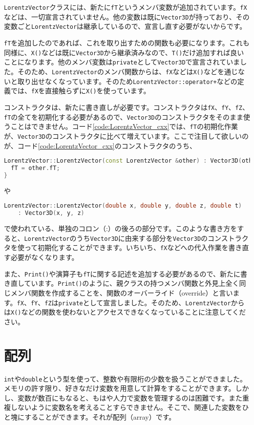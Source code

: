 \texttt{LorentzVector}クラスには、新たに\texttt{fT}というメンバ変数が追加されています。\texttt{fX}などは、一切宣言されていません。他の変数は既に\texttt{Vector3D}が持っており、その変数ごと\texttt{LorentzVector}は継承しているので、宣言し直す必要がないからです。

\texttt{fT}を追加したのであれば、これを取り出すための関数も必要になります。これも同様に、\texttt{X()}などは既に\texttt{Vector3D}から継承済みなので、\texttt{T()}だけ追加すれば良いことになります。他のメンバ変数は\texttt{private}として\texttt{Vector3D}で宣言されていました。そのため、\texttt{LorentzVector}のメンバ関数からは、\texttt{fX}などは\texttt{X()}などを通じないと取り出せなくなっています。そのため\texttt{LorentzVector::operator+}などの定義では、\texttt{fX}を直接触らずに\texttt{X()}を使っています。

コンストラクタは、新たに書き直しが必要です。コンストラクタは\texttt{fX}、\texttt{fY}、\texttt{fZ}、\texttt{fT}の全てを初期化する必要があるので、\texttt{Vector3D}のコンストラクタをそのまま使うことはできません。コード\ref{code:LorentzVector_cxx}では、\texttt{fT}の初期化作業が、\texttt{Vector3D}のコンストラクタに比べて増えています。ここで注目して欲しいのが、コード\ref{code:LorentzVector_cxx}のコンストラクタのうち、
\begin{lstlisting}[language=c++]
LorentzVector::LorentzVector(const LorentzVector &other) : Vector3D(other) {
  fT = other.fT;
}
\end{lstlisting}
や
\begin{lstlisting}[language=c++]
LorentzVector::LorentzVector(double x, double y, double z, double t)
    : Vector3D(x, y, z)
\end{lstlisting}
で使われている、単独のコロン（:）の後ろの部分です。このような書き方をすると、\texttt{LorentzVector}のうち\texttt{Vector3D}に由来する部分を\texttt{Vector3D}のコンストラクタを使って初期化することができます。いちいち、\texttt{fX}などへの代入作業を書き直す必要がなくなります。

また、\texttt{Print()}や演算子も\texttt{fT}に関する記述を追加する必要があるので、新たに書き直しています。\texttt{Print()}のように、親クラスの持つメンバ関数と外見上全く同じメンバ関数を作成することを、関数のオーバーライド（override）と言います。\texttt{fX}、\texttt{fY}、\texttt{fZ}は\texttt{private}として宣言しました。そのため、\texttt{LorentzVector}からは\texttt{X()}などの関数を使わないとアクセスできなくなっていることに注意してください。

\section{配列}
\label{sec:arrays}
\texttt{int}や\texttt{double}という型を使って、整数や有限桁の少数を扱うことができました。メモリの許す限り、好きなだけ変数を用意して計算をすることができます。しかし、変数が数百にもなると、もはや人力で変数を管理するのは困難です。また重複しないように変数名を考えることすらできません。そこで、関連した変数をひと塊にすることができます。それが配列（array）です。

